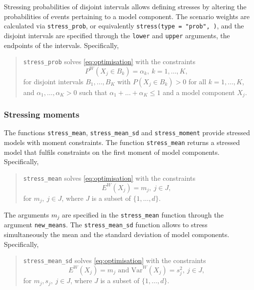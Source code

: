\documentclass[
]{article}
\begin{document}
Stressing probabilities of disjoint intervals allows defining stresses by altering the probabilities of events pertaining to a model component. The scenario weights are calculated via \texttt{stress\_prob}, or equivalently \texttt{stress(type\ =\ "prob",\ )}, and the disjoint intervals are specified through the \texttt{lower} and \texttt{upper} arguments, the endpoints of the intervals. Specifically,

\begin{quote}
\texttt{stress\_prob} solves \eqref{eq:optimisation} with the constraints
\begin{equation} 
P^W(X_j \in B_k) = \alpha_k, ~k = 1, \ldots, K, \label{eq:optimisationprob}
\end{equation}
for disjoint intervals \(B_1, \ldots, B_K\) with \(P(X_j \in B_k) >0\) for all \(k = 1, \ldots, K\), and \(\alpha_1, \ldots, \alpha_K > 0\) such that \(\alpha_1 + \ldots + \alpha_K \leq 1\) and a model component \(X_j\).
\end{quote}

\hypertarget{stressing-moments}{%
\subsubsection{Stressing moments}\label{stressing-moments}}

The functions \texttt{stress\_mean}, \texttt{stress\_mean\_sd} and \texttt{stress\_moment} provide stressed models with moment constraints. The function \texttt{stress\_mean} returns a stressed model that fulfils constraints on the first moment of model components. Specifically,

\begin{quote}
\texttt{stress\_mean} solves \eqref{eq:optimisation} with the constraints
\begin{equation} 
E^W(X_j) = m_j, ~j \in J, \label{eq:optimisationmean}
\end{equation}
for \(m_j, ~ j \in J\), where \(J\) is a subset of \(\{1, \ldots, d\}\).
\end{quote}

The arguments \(m_j\) are specified in the \texttt{stress\_mean} function through the argument \texttt{new\_means}. The \texttt{stress\_mean\_sd} function allows to stress simultaneously the mean and the standard deviation of model components. Specifically,

\begin{quote}
\texttt{stress\_mean\_sd} solves \eqref{eq:optimisation} with the constraints
\begin{equation} 
E^W(X_j) = m_j \text{ and Var}^W(X_j) = s_j^2 , ~j \in J, \label{eq:optimisationmeansd}
\end{equation}
for \(m_j, s_j, ~ j \in J\), where \(J\) is a subset of \(\{1, \ldots, d\}\).
\end{quote}
\end{document}
